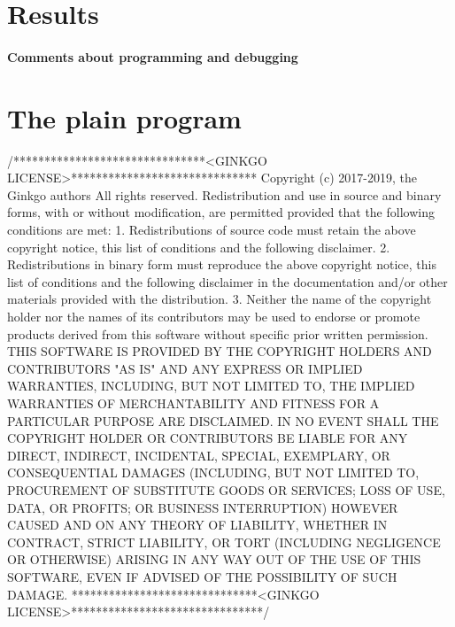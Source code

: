 \section*{Results}

\label{_Commentsaboutprogramminganddebugging}%
\paragraph*{Comments about programming and debugging }

\label{_PlainProg}%
 \section*{The plain program}


\begin{DoxyCodeInclude}
\textcolor{comment}{/*******************************<GINKGO LICENSE>******************************}
\textcolor{comment}{Copyright (c) 2017-2019, the Ginkgo authors}
\textcolor{comment}{All rights reserved.}
\textcolor{comment}{}
\textcolor{comment}{Redistribution and use in source and binary forms, with or without}
\textcolor{comment}{modification, are permitted provided that the following conditions}
\textcolor{comment}{are met:}
\textcolor{comment}{}
\textcolor{comment}{1. Redistributions of source code must retain the above copyright}
\textcolor{comment}{notice, this list of conditions and the following disclaimer.}
\textcolor{comment}{}
\textcolor{comment}{2. Redistributions in binary form must reproduce the above copyright}
\textcolor{comment}{notice, this list of conditions and the following disclaimer in the}
\textcolor{comment}{documentation and/or other materials provided with the distribution.}
\textcolor{comment}{}
\textcolor{comment}{3. Neither the name of the copyright holder nor the names of its}
\textcolor{comment}{contributors may be used to endorse or promote products derived from}
\textcolor{comment}{this software without specific prior written permission.}
\textcolor{comment}{}
\textcolor{comment}{THIS SOFTWARE IS PROVIDED BY THE COPYRIGHT HOLDERS AND CONTRIBUTORS "AS}
\textcolor{comment}{IS" AND ANY EXPRESS OR IMPLIED WARRANTIES, INCLUDING, BUT NOT LIMITED}
\textcolor{comment}{TO, THE IMPLIED WARRANTIES OF MERCHANTABILITY AND FITNESS FOR A}
\textcolor{comment}{PARTICULAR PURPOSE ARE DISCLAIMED. IN NO EVENT SHALL THE COPYRIGHT}
\textcolor{comment}{HOLDER OR CONTRIBUTORS BE LIABLE FOR ANY DIRECT, INDIRECT, INCIDENTAL,}
\textcolor{comment}{SPECIAL, EXEMPLARY, OR CONSEQUENTIAL DAMAGES (INCLUDING, BUT NOT}
\textcolor{comment}{LIMITED TO, PROCUREMENT OF SUBSTITUTE GOODS OR SERVICES; LOSS OF USE,}
\textcolor{comment}{DATA, OR PROFITS; OR BUSINESS INTERRUPTION) HOWEVER CAUSED AND ON ANY}
\textcolor{comment}{THEORY OF LIABILITY, WHETHER IN CONTRACT, STRICT LIABILITY, OR TORT}
\textcolor{comment}{(INCLUDING NEGLIGENCE OR OTHERWISE) ARISING IN ANY WAY OUT OF THE USE}
\textcolor{comment}{OF THIS SOFTWARE, EVEN IF ADVISED OF THE POSSIBILITY OF SUCH DAMAGE.}
\textcolor{comment}{******************************<GINKGO LICENSE>*******************************/}


\end{DoxyCodeInclude}
